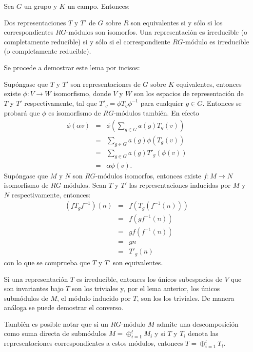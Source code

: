   \begin{teorema}\label{teo:relacionTG}
  Sea $G$ un grupo y $K$ un campo. Entonces:
  \begin{bulletList}
  \newItem Dos representaciones $T$ y $T'$ de $G$ sobre $R$ son equivalentes si y sólo si los correspondientes $RG\mbox{-módulos}$ son isomorfos.
  \newItem Una representación es irreducible (o completamente reducible) si y sólo si el correspondiente $RG\mbox{-módulo}$ es irreducible (o completamente reducible).
  \end{bulletList}
  \end{teorema}
  \begin{proof*}
  Se procede a demostrar este lema por incisos:
  \begin{bulletList}
  \newItem Supóngase que $T$ y $T'$ son representaciones de $G$ sobre $K$ equivalentes, entonces existe $\phi \colon V \to W$ isomorfismo, donde $V$ y $W$ son los espacios de representación de $T$ y $T'$ respectivamente, tal que $T'_g = \phi T_g \phi^{-1}$ para cualquier $g \in G$. Entonces se probará que $\phi$ es isomorfismo de $RG\mbox{-módulos}$ también.  En efecto
  \begin{eqnarray*}
   \phi(\alpha v) &=& \phi\left( \sum_{g \in G}a(g)T_g(v) \right) \\ 
   &=&  \sum_{g \in G}a(g)\phi(T_g(v)) \\
    & =& \sum_{g \in G}a(g)T'_g(\phi(v))\\ 
    &=& \alpha \phi(v).
  \end{eqnarray*}
   \newItem Supóngase que $M$ y $N$ son $RG\mbox{-módulos}$ isomorfos, entonces existe $f \colon M \to N$ isomorfismo de $RG\mbox{-módulos}$. Sean $T$ y $T'$ las representaciones inducidas por $M$ y $N$ respectivamente, entonces:
   \begin{eqnarray*}
   (fT_gf^{-1})(n) &=& 
    f\left(T_g\left(f^{-1}(n)\right)\right)\\
    &=& f\left(gf^{-1}(n)\right) \\
    &=& gf\left(f^{-1}(n)\right) \\
    &=& gn \\
    &=& T'_g(n)
   \end{eqnarray*} con lo que se comprueba que $T$ y $T'$ son equivalentes. 
   
   \newItem Si una representación $T$ es irreducible, entonces los únicos subespacios de $V$ que son invariantes bajo $T$ son los triviales y, por el lema anterior, los únicos submódulos de $M$, el módulo inducido por $T$, son los los triviales. De manera análoga se puede demostrar el converso. \qedhere
   \end{bulletList}
  \end{proof*}
  También es posible notar que si un $RG\mbox{-módulo}$ $M$ admite una descomposición como suma directa de submódulos $M = \oplus_{i = 1}^{t}M_i$ y si $T$ y $T_i$ denota las representaciones correspondientes a estos módulos, entonces $T = \oplus_{i = 1}^tT_i$. 
 
